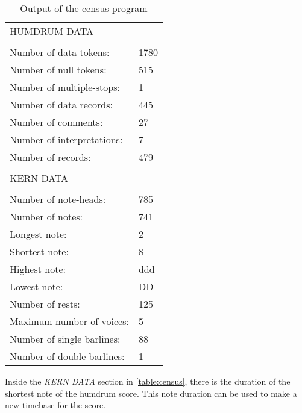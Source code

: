 		\begin{table}[]
		\centering
		\begin{tabular}{ll}
		HUMDRUM DATA &  \\
		 &  \\
		Number of data tokens: & 1780 \\
		Number of null tokens: & 515 \\
		Number of multiple-stops: & 1 \\
		Number of data records: & 445 \\
		Number of comments: & 27 \\
		Number of interpretations: & 7 \\
		Number of records: & 479 \\
		 &  \\
		KERN DATA &  \\
		 &  \\
		Number of note-heads: & 785 \\
		Number of notes: & 741 \\
		Longest note: & 2 \\
		Shortest note: & 8 \\
		Highest note: & ddd \\
		Lowest note: & DD \\
		Number of rests: & 125 \\
		Maximum number of voices: & 5 \\
		Number of single barlines: & 88 \\
		Number of double barlines: & 1
		\end{tabular}
		\caption{Output of the census program}
		\label{table:census}
		\end{table}

	Inside the \emph{KERN DATA} section in \autoref{table:census}, there is the duration of the shortest note of the humdrum score. This note duration can be used to make a new timebase for the score.

